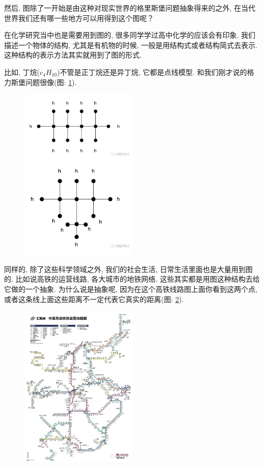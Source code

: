 然后, 图除了一开始是由这种对现实世界的格里斯堡问题抽象得来的之外, 在当代世界我们还有哪一些地方可以用得到这个图呢？

在化学研究当中也是需要用到图的, 很多同学学过高中化学的应该会有印象. 我们描述一个物体的结构, 尤其是有机物的时候, 一般是用结构式或者结构简式去表示. 这种结构的表示方法其实就用到了图的形式. 

比如, 丁烷($c_4H_10$)不管是正丁烷还是异丁烷, 它都是点线模型. 和我们刚才说的格力斯堡问题很像(图: \ref{fig:img24_3}). 

\begin{figure}[ht]
  \centering
  \includegraphics[width=0.5\textwidth]{asset/20231227144811.png}
  \caption{}
  \label{fig:img24_3}
\end{figure}

同样的, 除了这些科学领域之外, 我们的社会生活, 日常生活里面也是大量用到图的. 比如说高铁的运营线路, 各大城市的地铁网络, 这些其实都是用图这种结构去给它做的一个抽象. 为什么说是抽象呢, 因为在这个高铁线路图上面你看到这两个点, 或者这条线上面这些距离不一定代表它真实的距离(图: \ref{fig:img24_4}). 

\begin{figure}[ht]
  \centering
  \includegraphics[width=0.5\textwidth]{asset/20231227144832.png}
  \caption{}
  \label{fig:img24_4}
\end{figure}


